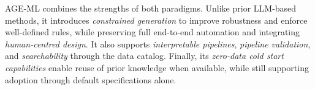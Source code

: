 \documentclass[runningheads]{llncs}
\newcommand{\ourapproach}[0]{\textsc{AGE-ML}}
\begin{document}
\ourapproach{} combines the strengths of both paradigms.
%
Unlike prior \ac{LLM}-based methods,
it introduces \emph{constrained generation} to improve robustness and enforce well-defined rules,
while preserving full end-to-end automation and integrating \emph{human-centred design}.
%
It also supports \emph{interpretable pipelines},
\emph{pipeline validation},
and \emph{searchability} through the data catalog.
%
Finally, its \emph{zero-data cold start capabilities} enable reuse of prior knowledge when available,
while still supporting adoption through default specifications alone.



\end{document}
